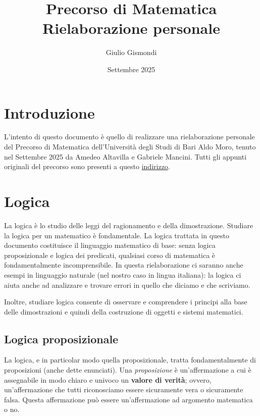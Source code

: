 \documentclass{article}
\begin{document}
\title{
  Precorso di Matematica \\
  \large Rielaborazione personale}
\author{Giulio Gismondi}
\date{Settembre 2025}
\maketitle

\tableofcontents


\section{Introduzione}
L'intento di questo documento è quello di realizzare una rielaborazione personale
del Precorso di Matematica dell'Università degli Studi di Bari Aldo Moro, tenuto nel
Settembre 2025 da Amedeo Altavilla e Gabriele Mancini. Tutti gli appunti originali 
del precorso sono presenti a questo \href{https://www.dm.uniba.it/it/didattica/precorsi/a-a-2025-26/precorso-di-matematica}{indirizzo}.


\section{Logica}
La logica è lo studio delle leggi del ragionamento e della dimostrazione.
Studiare la logica per un matematico è fondamentale. La logica trattata in questo documento
costituisce il linguaggio matematico di base: senza logica proposizionale e logica dei predicati, qualsiasi corso di matematica è fondamentalmente incomprensibile.
In questa rielaborazione ci saranno anche esempi in linguaggio naturale 
(nel nostro caso in lingua italiana): la logica ci aiuta anche ad analizzare e
trovare errori in quello che diciamo e che scriviamo.

Inoltre, studiare logica consente di osservare e comprendere i principi alla base
delle dimostrazioni e quindi della costruzione di oggetti e sistemi matematici.

\subsection{Logica proposizionale}
La logica, e in particolar modo quella proposizionale, tratta fondamentalmente di
proposizioni (anche dette enunciati). Una \textit{proposizione} è un'affermazione a cui è assegnabile
in modo chiaro e univoco un \textbf{valore di verità}; ovvero, un'affermazione che tutti riconosciamo 
essere sicuramente vera o sicuramente falsa. Questa affermazione può essere un'affermazione
ad argomento matematica o no. 
\end{document}
